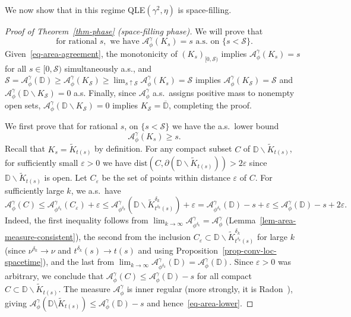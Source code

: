 \documentclass[a4paper]{article}
\numberwithin{equation}{section}
\def\eps{\varepsilon}
\newcommand{\eqb}{\begin{equation}}
\newcommand{\eqe}{\end{equation}}
\newcommand{\D}{\mathbb{D}}
\newcommand{\clD}{\overline{\mathbb{D}}}
\newcommand{\cA}{\mathcal{A}}
\newcommand{\qduration}{\mathcal{S}}
\theoremstyle{remark}
\numberwithin{equation}{section}
\begin{document}
We now show that in this regime QLE$(\gamma^2, \eta)$ is space-filling.


\begin{proof}[{Proof of Theorem~\ref{thm-phase} (space-filling phase)}]
We will prove that 
\eqb\label{eq-area-agreement}
\text{for rational }s, \text{ we have } \cA^\gamma_{\phi}(K_s) = s \text{ a.s.\ on }\{ s < \qduration\}.
\eqe
Given~\eqref{eq-area-agreement}, the monotonicity of $(K_s)_{[0,\qduration)}$ implies $\cA^\gamma_\phi(K_s) = s$ for all $s \in [0, \qduration)$ simultaneously a.s., and $\qduration = \cA^\gamma_\phi(\D) \geq \cA^\gamma_\phi(K_{\qduration}) \geq \lim_{s \uparrow \qduration} \cA^\gamma_{\phi}(K_s) = \qduration$ implies $\cA^\gamma_\phi(K_\qduration) = \qduration$ and $\cA^\gamma_\phi(\D \backslash K_\qduration) = 0$ a.s. Finally, since $\cA^\gamma_\phi$ a.s.\ assigns positive mass to nonempty open sets, $\cA^\gamma_\phi(\D \backslash K_\qduration) = 0$  implies $K_\qduration = \clD$, completing the proof. 


We first prove that for rational $s$, on $\{ s < \qduration\}$ we have the a.s.\ lower bound   \begin{equation}\label{eq-area-lower}
     \cA^\gamma_{\phi}(K_s) \geq s.
\end{equation} 
Recall that $K_s = \tilde K_{t(s)}$ by definition. 
For any compact subset $C$ of $\D \backslash \tilde K_{t(s)}$, for sufficiently small $\eps>0$ we have $\mathrm{dist}(C, \partial (\D \backslash \tilde K_{t(s)}))>2\eps$ since $\D \backslash \tilde K_{t(s)}$ is open. Let $C_\eps$ be the set of points within distance $\eps$ of $C$. For sufficiently large $k$, we a.s.\ have 
\[\cA^\gamma_{\phi}(C) \leq \cA^\gamma_{\phi^{\delta_k}}(C_\eps) +\eps \leq \cA^\gamma_{\phi^{\delta_k}}(\D \backslash \tilde K^{\delta_k}_{t^{\delta_k}(s)}) +\eps = \cA^\gamma_{\phi^{\delta_k}}(\D) - s + \eps \leq \cA^\gamma_{\phi}(\D) - s + 2\eps.\]
Indeed, the first inequality follows from $\lim_{k \to \infty} \cA^\gamma_{\phi^{\delta_k}} = \cA^\gamma_{\phi}$ (Lemma~\ref{lem-area-measure-consistent}), the second from the inclusion $C_\eps \subset \D \backslash \tilde K^{\delta_k}_{t^{\delta_k}(s)}$ for large $k$ (since $\nu^{\delta_k} \to \nu$ and $t^{\delta_k}(s) \to t(s)$ and using Proposition~\ref{prop-conv-loc-spacetime}), and the last from $\lim_{k\to\infty}\cA^\gamma_{\phi^{\delta_k}}(\D)=\cA^\gamma_{\phi}(\D)$. Since $\eps>0$ was arbitrary, we conclude that $\cA^\gamma_{\phi}(C) \leq \cA^\gamma_{\phi}(\D) - s$ for all compact $C \subset \D \backslash \tilde K_{t(s)}$. The measure $\cA^\gamma_{\phi}$ is inner regular (more strongly, it is Radon~\cite{rhodes2013gaussianmultiplicativechaosapplications}), giving $\cA^\gamma_{\phi}(\D \setminus \tilde K_{t(s)}) \leq \cA^\gamma_{\phi}(\D) - s$ and hence~\eqref{eq-area-lower}. 
  


\end{proof}
\end{document}
